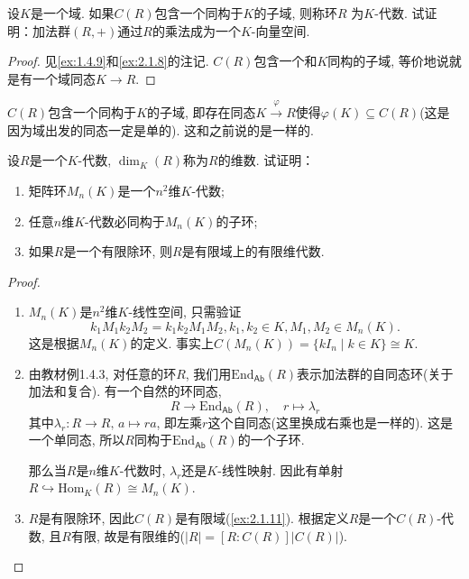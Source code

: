 \begin{problem}\label{ex:2.1.12}
    设$K$是一个域. 如果$C(R)$包含一个同构于$K$的子域, 则称环$R$
为$K$-代数. 试证明：加法群$(R, +)$通过$R$的乘法成为一个$K$-向量空间.
\end{problem}

\begin{proof}
    见\ref{ex:1.4.9}和\ref{ex:2.1.8}的注记. $C(R)$包含一个和$K$同构的子域, 等价地说就是有一个域同态$K \to R$.
\end{proof}

\begin{remark}
    $C(R)$包含一个同构于$K$的子域, 即存在同态$K \overset{\varphi}\to R$使得$\varphi(K) \subseteq C(R)$(这是因为域出发的同态一定是单的). 这和之前说的是一样的.
\end{remark}

\begin{problem}
    设$R$是一个$K$-代数, $\dim_K(R)$称为$R$的维数.
试证明：
\begin{enumerate}[(1)]
    \item 矩阵环$M_n(K)$是一个$n^2$维$K$-代数;
    \item 任意$n$维$K$-代数必同构于$M_n(K)$的子环;
    \item 如果$R$是一个有限除环, 则$R$是有限域上的有限维代数.
\end{enumerate}
\end{problem}

\begin{proof}
    \begin{enumerate}[(1)]
        \item $M_n(K)$是$n^2$维$K$-线性空间, 只需验证
        \[
            k_1M_1k_2M_2 = k_1k_2M_1M_2, k_1, k_2 \in K, M_1, M_2 \in M_n(K).
        \]
        这是根据$M_n(K)$的定义. 事实上$C(M_n(K)) = \{kI_n \mid k \in K\} \cong K$.
        \item 由教材例1.4.3, 对任意的环$R$, 我们用$\mathrm{End}_{\mathsf{Ab}}(R)$表示加法群的自同态环(关于加法和复合). 有一个自然的环同态,
        \[
            R \to \mathrm{End}_{\mathsf{Ab}}(R),\quad r \mapsto \lambda_r
        \]
        其中$\lambda_r: R \to R,\, a \mapsto ra$, 即左乘$r$这个自同态(这里换成右乘也是一样的). 这是一个单同态, 所以$R$同构于$\mathrm{End}_{\mathsf{Ab}}(R)$的一个子环.

        那么当$R$是$n$维$K$-代数时, $\lambda_r$还是$K$-线性映射. 因此有单射$R \hookrightarrow \mathrm{Hom}_K(R) \cong M_n(K)$.
        \item $R$是有限除环, 因此$C(R)$是有限域(\ref{ex:2.1.11}). 根据定义$R$是一个$C(R)$-代数, 且$R$有限, 故是有限维的($|R| = [R:C(R)]|C(R)|$).
    \end{enumerate}
\end{proof}

